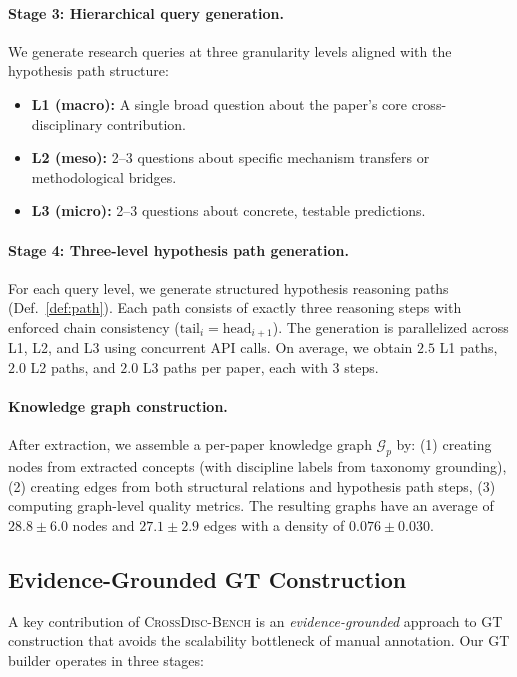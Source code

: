 \documentclass{article}
\newcommand{\ours}{\textsc{CrossDisc-Bench}}
\begin{document}
\paragraph{Stage 3: Hierarchical query generation.}
We generate research queries at three granularity levels aligned with the hypothesis path structure:
\begin{itemize}[leftmargin=*,topsep=1pt,itemsep=0pt]
\item \textbf{L1 (macro):} A single broad question about the paper's core cross-disciplinary contribution.
\item \textbf{L2 (meso):} 2--3 questions about specific mechanism transfers or methodological bridges.
\item \textbf{L3 (micro):} 2--3 questions about concrete, testable predictions.
\end{itemize}

\paragraph{Stage 4: Three-level hypothesis path generation.}
For each query level, we generate structured hypothesis reasoning paths (Def.~\ref{def:path}).
Each path consists of exactly three reasoning steps with enforced chain consistency ($\text{tail}_i = \text{head}_{i+1}$).
The generation is parallelized across L1, L2, and L3 using concurrent API calls.
On average, we obtain $2.5$ L1 paths, $2.0$ L2 paths, and $2.0$ L3 paths per paper, each with 3 steps.

\paragraph{Knowledge graph construction.}
After extraction, we assemble a per-paper knowledge graph $\mathcal{G}_p$ by:
(1) creating nodes from extracted concepts (with discipline labels from taxonomy grounding),
(2) creating edges from both structural relations and hypothesis path steps,
(3) computing graph-level quality metrics.
The resulting graphs have an average of $28.8 \pm 6.0$ nodes and $27.1 \pm 2.9$ edges with a density of $0.076 \pm 0.030$.

\subsection{Evidence-Grounded GT Construction}
\label{sec:gt}

A key contribution of \ours{} is an \emph{evidence-grounded} approach to GT construction that avoids the scalability bottleneck of manual annotation.
Our GT builder operates in three stages:
\end{document}
